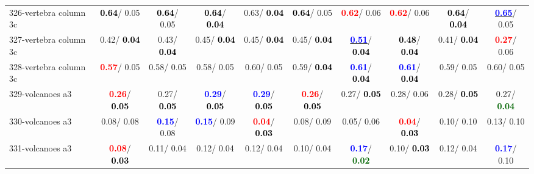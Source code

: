 \begin{table}[h]
\begin{center}
{\begin{tabular}{lc|c|c|c|c|c|c|c|c}
326-vertebra column 3c & \textcolor{black}{\textbf{  0.64}}/  0.05 & \textcolor{black}{\textbf{  0.64}}/  0.05 & \textcolor{black}{\textbf{  0.64}}/\textcolor{black}{\textbf{  0.04}} &   0.63/\textcolor{black}{\textbf{  0.04}} & \textcolor{black}{\textbf{  0.64}}/  0.05 & \textcolor{red}{\textbf{  0.62}}/  0.06 & \textcolor{red}{\textbf{  0.62}}/  0.06 & \textcolor{black}{\textbf{  0.64}}/\textcolor{black}{\textbf{  0.04}} & \underline{\textcolor{blue}{\textbf{  0.65}}}/  0.05 \\
327-vertebra column 3c &   0.42/\textcolor{black}{\textbf{  0.04}} &   0.43/\textcolor{black}{\textbf{  0.04}} &   0.45/\textcolor{black}{\textbf{  0.04}} &   0.45/\textcolor{black}{\textbf{  0.04}} &   0.45/\textcolor{black}{\textbf{  0.04}} & \underline{\textcolor{blue}{\textbf{  0.51}}}/\textcolor{black}{\textbf{  0.04}} & \textcolor{black}{\textbf{  0.48}}/\textcolor{black}{\textbf{  0.04}} &   0.41/\textcolor{black}{\textbf{  0.04}} & \textcolor{red}{\textbf{  0.27}}/  0.06 \\ \hline
328-vertebra column 3c & \textcolor{red}{\textbf{  0.57}}/  0.05 &   0.58/  0.05 &   0.58/  0.05 &   0.60/  0.05 &   0.59/\textcolor{black}{\textbf{  0.04}} & \textcolor{blue}{\textbf{  0.61}}/\textcolor{black}{\textbf{  0.04}} & \textcolor{blue}{\textbf{  0.61}}/\textcolor{black}{\textbf{  0.04}} &   0.59/  0.05 &   0.60/  0.05 \\
329-volcanoes a3 & \textcolor{red}{\textbf{  0.26}}/\textcolor{black}{\textbf{  0.05}} &   0.27/\textcolor{black}{\textbf{  0.05}} & \textcolor{blue}{\textbf{  0.29}}/\textcolor{black}{\textbf{  0.05}} & \textcolor{blue}{\textbf{  0.29}}/\textcolor{black}{\textbf{  0.05}} & \textcolor{red}{\textbf{  0.26}}/\textcolor{black}{\textbf{  0.05}} &   0.27/\textcolor{black}{\textbf{  0.05}} &   0.28/  0.06 &   0.28/\textcolor{black}{\textbf{  0.05}} &   0.27/\textcolor{darkgreen}{\textbf{  0.04}} \\
330-volcanoes a3 &   0.08/  0.08 & \textcolor{blue}{\textbf{  0.15}}/  0.08 & \textcolor{blue}{\textbf{  0.15}}/  0.09 & \textcolor{red}{\textbf{  0.04}}/\textcolor{black}{\textbf{  0.03}} &   0.08/  0.09 &   0.05/  0.06 & \textcolor{red}{\textbf{  0.04}}/\textcolor{black}{\textbf{  0.03}} &   0.10/  0.10 &   0.13/  0.10 \\
331-volcanoes a3 & \textcolor{red}{\textbf{  0.08}}/\textcolor{black}{\textbf{  0.03}} &   0.11/  0.04 &   0.12/  0.04 &   0.12/  0.04 &   0.10/  0.04 & \textcolor{blue}{\textbf{  0.17}}/\textcolor{darkgreen}{\textbf{  0.02}} &   0.10/\textcolor{black}{\textbf{  0.03}} &   0.12/  0.04 & \textcolor{blue}{\textbf{  0.17}}/  0.10 \\

\end{tabular}}
\end{center}
\end{table}
